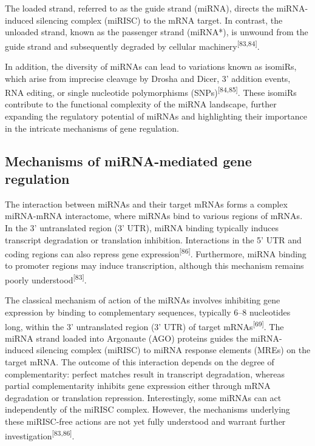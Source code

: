 \documentclass[
  11pt,
  letterpaper,
]{book}
\begin{document}
The loaded strand, referred to as the guide strand (miRNA), directs the
miRNA-induced silencing complex (miRISC) to the mRNA target. In
contrast, the unloaded strand, known as the passenger strand (miRNA*),
is unwound from the guide strand and subsequently degraded by cellular
machinery\textsuperscript{{[}83,84{]}}.

In addition, the diversity of miRNAs can lead to variations known as
isomiRs, which arise from imprecise cleavage by Drosha and Dicer, 3'
addition events, RNA editing, or single nucleotide polymorphisms
(SNPs)\textsuperscript{{[}84,85{]}}. These isomiRs contribute to the
functional complexity of the miRNA landscape, further expanding the
regulatory potential of miRNAs and highlighting their importance in the
intricate mechanisms of gene regulation.

\subsection{Mechanisms of miRNA-mediated gene
regulation}\label{mechanisms-of-mirna-mediated-gene-regulation}

The interaction between miRNAs and their target mRNAs forms a complex
miRNA-mRNA interactome, where miRNAs bind to various regions of mRNAs.
In the 3' untranslated region (3' UTR), miRNA binding typically induces
transcript degradation or translation inhibition. Interactions in the 5'
UTR and coding regions can also repress gene
expression\textsuperscript{{[}86{]}}. Furthermore, miRNA binding to
promoter regions may induce transcription, although this mechanism
remains poorly understood\textsuperscript{{[}83{]}}.

The classical mechanism of action of the miRNAs involves inhibiting gene
expression by binding to complementary sequences, typically 6--8
nucleotides long, within the 3' untranslated region (3' UTR) of target
mRNAs\textsuperscript{{[}69{]}}. The miRNA strand loaded into Argonaute
(AGO) proteins guides the miRNA-induced silencing complex (miRISC) to
miRNA response elements (MREs) on the target mRNA. The outcome of this
interaction depends on the degree of complementarity: perfect matches
result in transcript degradation, whereas partial complementarity
inhibits gene expression either through mRNA degradation or translation
repression. Interestingly, some miRNAs can act independently of the
miRISC complex. However, the mechanisms underlying these miRISC-free
actions are not yet fully understood and warrant further
investigation\textsuperscript{{[}83,86{]}}.
\end{document}
